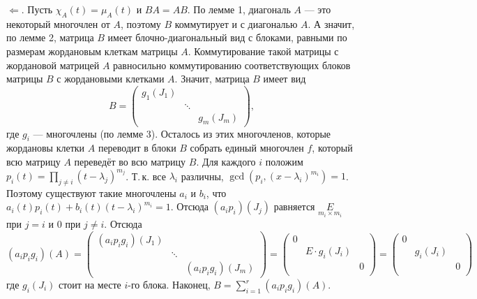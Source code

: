 \begin{solution}
    $\Leftarrow$. Пусть $\chi_A(t) = \mu_A(t)$ и $BA = AB$. По лемме 1, диагональ $A$ --- это некоторый многочлен от $A$, поэтому $B$ коммутирует и с диагональю $A$. А значит, по лемме 2, матрица $B$ имеет блочно-диагональный вид с блоками, равными по размерам жордановым клеткам матрицы $A$. Коммутирование такой матрицы с жордановой матрицей $A$ равносильно коммутированию соответствующих блоков матрицы $B$ с жордановыми клетками $A$. Значит, матрица $B$ имеет вид
    \[
        B =
        \begin{pmatrix}
            g_1(J_1) & & \\
             & \ddots & \\
             & & g_m(J_m)
        \end{pmatrix},
    \]
    где $g_i$ --- многочлены (по лемме 3). Осталось из этих многочленов, которые жордановы клетки $A$ переводит в блоки $B$ собрать единый многочлен $f$, который всю матрицу $A$ переведёт во всю матрицу $B$. Для каждого $i$ положим $p_i(t) = \prod\limits_{j \ne i}(t - \lambda_j)^{m_j}$. Т.\,к. все $\lambda_i$ различны, $\gcd(p_i, (x - \lambda_i)^{m_i}) = 1$. Поэтому существуют такие многочлены $a_i$ и $b_i$, что $a_i(t)p_i(t) + b_i(t)(t - \lambda_i)^{m_i} = 1$. Отсюда $(a_ip_i)(J_{j})$ равняется $\underset{m_i \times m_i}{E}$ при $j = i$ и $0$ при $j \ne i$. Отсюда
    \[
        (a_ip_ig_i)(A) =
        \begin{pmatrix}
            (a_ip_ig_i)(J_1) & & \\
             & \ddots & \\
             & & (a_ip_ig_i)(J_m)
        \end{pmatrix} = 
        \begin{pmatrix}
            0 & & \\
            & E \cdot g_i(J_i) & \\
             & & 0\\
        \end{pmatrix} =
        \begin{pmatrix}
            0 & & \\
            & g_i(J_i) & \\
             & & 0\\
        \end{pmatrix}
    \]
    где $g_i(J_i)$ стоит на месте $i$-го блока. Наконец, $B = \sum\limits_{i = 1}^r(a_ip_ig_i)(A)$.


\end{solution}
